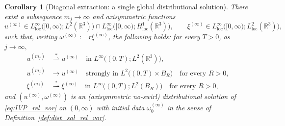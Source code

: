 \documentclass[reqno,11pt]{amsart}
\newtheorem{corollary}[theorem]{Corollary}
\begin{document}
\begin{corollary}[Diagonal extraction: a single global distributional solution]
\label{cor:global_distributional_limit}
There exist a subsequence \(m_j\to\infty\) and axisymmetric functions
\[
u^{(\infty)}\in L^\infty_{\mathrm{loc}}\bigl([0,\infty);L^2(\mathbb{R}^3)\bigr)
\cap L^\infty_{\mathrm{loc}}\bigl([0,\infty);H^1_{\mathrm{loc}}(\mathbb{R}^3)\bigr),
\qquad
\xi^{(\infty)}\in L^\infty_{\mathrm{loc}}\bigl([0,\infty);L^2_{\mathrm{loc}}(\mathbb{R}^3)\bigr),
\]
such that, writing \(\omega^{(\infty)}:=r\xi^{(\infty)}\), the following holds: for every \(T>0\), as $j\to\infty,$
\begin{align*}
u^{(m_j)} &\overset{*}{\rightharpoonup} u^{(\infty)}
\quad\text{in }L^\infty\bigl((0,T);L^2(\mathbb{R}^3)\bigr),
\\
u^{(m_j)} &\to u^{(\infty)}
\quad\text{strongly in }L^2\bigl((0,T)\times B_R\bigr)
\quad\text{for every }R>0,
\\
\xi^{(m_j)} &\overset{*}{\rightharpoonup} \xi^{(\infty)}
\quad\text{in }L^\infty\bigl((0,T);L^2(B_R)\bigr)
\quad\text{for every }R>0,
\end{align*}
and \((u^{(\infty)},\omega^{(\infty)})\) is an (axisymmetric no-swirl) distributional solution of
\eqref{eq:IVP_rel_vor} on \((0,\infty)\) with initial data \(\omega_0^{(\infty)}\) in the sense of
Definition~\ref{def:dist_sol_rel_vor}.
\end{corollary}
\end{document}
